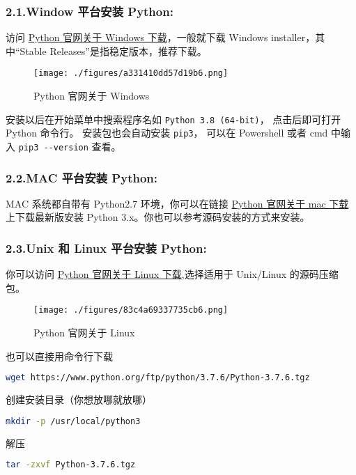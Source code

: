 \subsubsection{2.1.Window 平台安装 Python:}
访问 \href{https://www.python.org/downloads/windows/}{Python 官网关于 Windows 下载}，一般就下载  Windows installer，其中“Stable Releases”是指稳定版本，推荐下载。
\begin{figure}[ht]
\centering
\texttt{[image: ./figures/a331410dd57d19b6.png]}
\caption{Python 官网关于 Windows} \label{fig_Python_1}
\end{figure}
安装以后在开始菜单中搜索程序名如 \verb`Python 3.8 (64-bit)`， 点击后即可打开 Python 命令行。 安装包也会自动安装 \verb`pip3`， 可以在 Powershell 或者 cmd 中输入 \verb`pip3 --version` 查看。

\subsubsection{2.2.MAC 平台安装 Python:}
MAC 系统都自带有 Python2.7 环境，你可以在链接 \href{https://www.python.org/downloads/mac-osx/}{Python 官网关于 mac 下载} 上下载最新版安装 Python 3.x。你也可以参考源码安装的方式来安装。

\subsubsection{2.3.Unix 和 Linux 平台安装 Python:}
你可以访问 \href{https://www.python.org/downloads/source/}{Python 官网关于 Linux 下载},选择适用于 Unix/Linux 的源码压缩包。
\begin{figure}[ht]
\centering
\texttt{[image: ./figures/83c4a69337735cb6.png]}
\caption{Python 官网关于 Linux} \label{fig_Python_2}
\end{figure}

也可以直接用命令行下载
\begin{lstlisting}[language=bash]
wget https://www.python.org/ftp/python/3.7.6/Python-3.7.6.tgz
\end{lstlisting}

创建安装目录（你想放哪就放哪）
\begin{lstlisting}[language=bash]
mkdir -p /usr/local/python3
\end{lstlisting}

解压
\begin{lstlisting}[language=bash]
tar -zxvf Python-3.7.6.tgz
\end{lstlisting}

